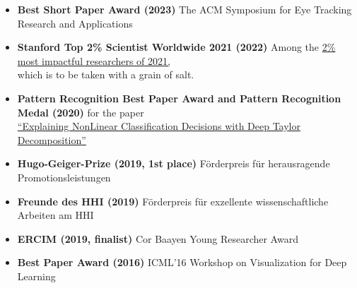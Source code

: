 
\begin{itemize}
    \item[] \textbf{Best Short Paper Award (2023)}
    The ACM Symposium for Eye Tracking Research and Applications

    \item [] \textbf{Stanford Top 2\% Scientist Worldwide 2021 (2022)}
    Among the \href{https://elsevier.digitalcommonsdata.com/datasets/btchxktzyw/4}{2\% most impactful researchers of 2021,}\\
    {\vphantom{}\qquad which is to be taken with a grain of salt.}

    \item[] \textbf{Pattern Recognition Best Paper Award and Pattern Recognition Medal (2020)}
    for the paper\\
    \href{https://doi.org/10.1016/j.patcog.2016.11.008}{\qquad ``Explaining NonLinear Classification Decisions with Deep Taylor Decomposition''}

    \item[] \textbf{Hugo-Geiger-Prize (2019, 1st place)}
    F\"orderpreis f\"ur herausragende Promotionsleistungen
    
    \item[] \textbf{Freunde des HHI (2019)}
    F\"orderpreis f\"ur exzellente wissenschaftliche Arbeiten am HHI
    
    \item[] \textbf{ERCIM (2019, finalist)}
    Cor Baayen Young Researcher Award

    \item[] \textbf{Best Paper Award (2016)}
    ICML'16 Workshop on Visualization for Deep Learning
\end{itemize}
